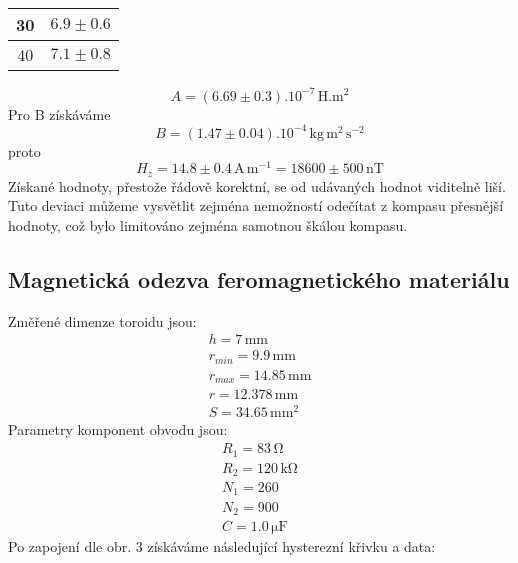 \documentclass[czech,11pt,a4paper]{article}
\begin{document}
\begin{multicols}{2}
\begin{center}
\begin{tabular}{|c|c|}
		30     & $6.9 \pm    0.6      $               \\ \hline
		40     &$ 7.1 \pm    0.8      $               \\ \hline
	\end{tabular}
	\end{center}
	\begin{equation}
		A = (6.69 \pm 0.3 ).10^{-7} \,\mathrm{H. m^2}
	\end{equation}
	Pro B získáváme
	\begin{equation}
		B = (1.47 \pm 0.04).10^{-4} \,\mathrm{kg\, m^2\, s^{-2}}
	\end{equation}
	proto 
	\begin{equation}
		H_z = 14.8 \pm 0.4 \,\mathrm{A\,m^{-1}} = 18600 \pm 500 \,\mathrm{nT}
	\end{equation}
	Získané hodnoty, přestože řádově korektní, se od udávaných hodnot viditelně liší. Tuto deviaci můžeme vysvětlit zejména nemožností odečítat z kompasu přesnější hodnoty, což bylo limitováno zejména samotnou škálou kompasu.
	\subsection{Magnetická odezva feromagnetického materiálu}
	Změřené dimenze toroidu jsou:
	\begin{gather*}
		h = 7\,\mathrm{mm}\\
		r_{min} = 9.9\,\mathrm{mm}\\
		r_{max} = 14.85 \,\mathrm{mm}\\
		r = 12.378\,\mathrm{mm}\\
		S = 34.65\,\mathrm{mm^2}
	\end{gather*}
	Parametry komponent obvodu jsou:
	\begin{gather*}
		R_1 = 83 \,\mathrm{\Omega}\\
		R_2 = 120 \,\mathrm{k\Omega}\\
		N_1 = 260 \\
		N_2 = 900 \\
		C = 1.0 \,\mathrm{\mu F}
	\end{gather*}
 	Po zapojení dle obr. 3 získáváme následující hysterezní křivku a data:
 	\begin{figure}[H]
 		\begin{center}
 			

\end{center}
\end{figure}
\end{multicols}
\end{document}
